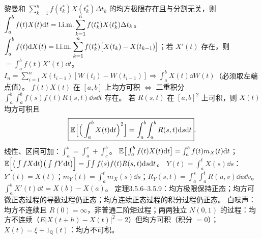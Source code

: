 \documentclass[UTF8,12pt,a4paper]{ctexart}
\begin{document}
 黎曼和 $\sum_{k=1}^nf(t_k^*)X(t_k^*)\Delta t_k$ 的均方极限存在且与分割无关，则
$\displaystyle\int_a^b f(t)X(t)\mathrm{d} t=\mathop{\mathrm{l.i.m.}}\sum_{k=1}^nf(t_k^*)X(t_k^*)\Delta t_k$。
 $\displaystyle\int_a^b f(t)\mathrm{d} X(t)=\mathop{\mathrm{l.i.m.}}\sum_{k=1}^nf(t_k^*)\big[X(t_k)-X(t_{k-1})\big]$；若 $X'(t)$ 存在，则 $=\int_a^bf(t)X'(t)\dd t$。
 $I_n=\sum_{i=1}^nX(t_{i-1})[W(t_i)-W(t_{i-1})]\Rightarrow \int_a^bX(t)\dd W(t)$（必须取左端点值）。
 $f(t)X(t)$ 在 $[a,b]$ 上均方可积 $\iff$ 二重积分 $\displaystyle\int_a^b\!\int_a^b f(s)f(t)R(s,t)\dd s\dd t$ 存在。
 若 $R(s,t)$ 在 $[a,b]^2$ 上可积，则 $X(t)$ 均方可积且
$$\boxed{\mathbb{E}\Big[\Big(\int_a^b X(t)\mathrm{d} t\Big)^2\Big]=\int_a^b\!\int_a^b R(s,t)\mathrm{d} s\mathrm{d} t}.$$
 线性、区间可加：$\int_a^b=\int_a^c+\int_c^b$。
 $\mathbb{E}\big[\int_a^bf(t)X(t)\mathrm{d} t\big]=\int_a^bf(t)m_X(t)\mathrm{d} t$；$\mathbb{E}\Big[\big(\int f X\mathrm{d} t\big)\big(\int f Y\mathrm{d} t\big)\Big]=\int\!\int f(s)f(t)R(s,t)\mathrm{d} s\mathrm{d} t$。
 $Y(t)=\int_a^tX(s)\dd s$：$Y'(t)=X(t)$；$m_Y(t)=\int_a^tm_X(s)\dd s$；$R_Y(s,t)=\int_a^s\!\int_a^tR(u,v)\dd u\dd v$。
 $\displaystyle\int_a^bX'(t)\dd t=X(b)-X(a)$。
 定理3.5.6--3.5.9：均方极限保持正态；均方可微正态过程的导数过程仍正态；均方连续正态过程的积分过程仍正态。
 白噪声：均方不连续且 $R(0)=\infty$，非普通二阶矩过程；两两独立 $N(0,1)$ 的过程：均方不连续（$E|X(t+h)-X(t)|^2=2$）但均方可积（积分 $=0$）；$X(t)=\xi+1_{\mathbb Q}(t)$：均方不可积。
\end{document}

